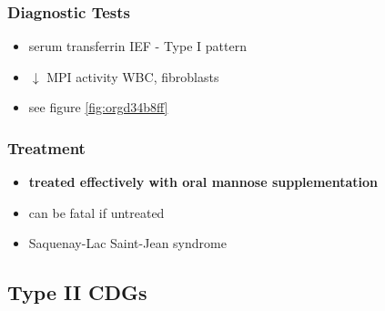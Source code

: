 \documentclass[12pt]{scrartcl}
\begin{document}
\subsubsection{Diagnostic Tests}
\label{sec:org2f852a2}
\begin{itemize}
\item serum transferrin IEF - Type I pattern
\item \(\downarrow\) MPI activity WBC, fibroblasts
\item see figure \ref{fig:orgd34b8ff}
\end{itemize}
\subsubsection{Treatment}
\label{sec:org4315a7c}
\begin{itemize}
\item \textbf{treated effectively with oral mannose supplementation}
\item can be fatal if untreated
\item Saquenay-Lac Saint-Jean syndrome
\end{itemize}

\subsection{Type II CDGs}
\label{sec:orga41574c}
\end{document}
